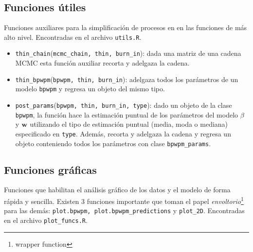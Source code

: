\documentclass[../../Main/Main.tex]{subfiles}
\begin{document}
\subsection*{Funciones útiles}
Funciones auxiliares para la simplificación de procesos en en las funciones de más alto nivel. Encontradas en el archivo \verb|utils.R|.
\begin{itemize}[label={}]
	\item \verb|thin_chain|(\verb|mcmc_chain, thin, burn_in|): dada una matriz de una cadena MCMC esta función auxiliar recorta y adelgaza la cadena.
	\item \verb|thin_bpwpm|(\verb|bpwpm, thin, burn_in|): adelgaza todos los parámetros de un modelo \verb|bpwpm| y regresa un objeto del mismo tipo. 
	\item \verb|post_params|(\verb|bpwpm, thin, burn_in, type|): dado un objeto de la clase \verb|bpwpm|, la función hace la estimación puntual de los parámetros del modelo $\beta$ y $\mathbf{w}$ utilizando el tipo de estimación puntual (media, moda o mediana) especificado en \verb|type|. Además, recorta y adelgaza la cadena y regresa un objeto conteniendo todos los parámetros con clase \verb|bpwpm_params|.
\end{itemize}

\subsection*{Funciones gráficas}
Funciones que habilitan el análisis gráfico de los datos y el modelo de forma rápida y sencilla. Existen 3 funciones importante que toman el papel \textit{envoltorio}\footnote{wrapper function} para las demás: \verb|plot.bpwpm, plot.bpwpm_predictions| y \verb|plot_2D|. Encontradas en el archivo \verb|plot_funcs.R|.
\end{document}
